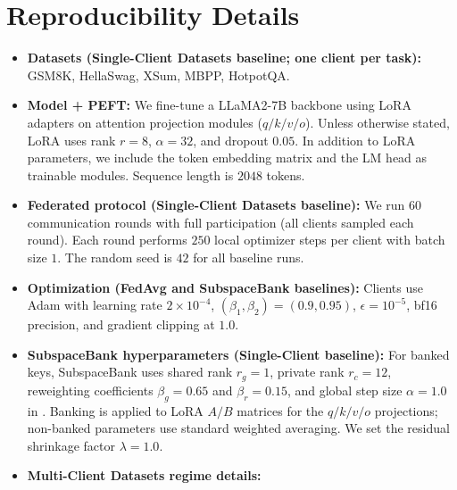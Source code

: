 \documentclass{article}
\theoremstyle{plain}
\theoremstyle{definition}
\theoremstyle{remark}
\begin{document}
\nocite{langley00}




\newpage
\appendix
\onecolumn

\section{Reproducibility Details}
\label{sec:appendix-repro}

\begin{itemize}
  \item \textbf{Datasets (Single-Client Datasets baseline; one client per task):}
  GSM8K, HellaSwag, XSum, MBPP, HotpotQA.

  \item \textbf{Model + PEFT:}
  We fine-tune a LLaMA2-7B backbone using LoRA adapters on attention projection
  modules ($q/k/v/o$). Unless otherwise stated, LoRA uses rank $r=8$,
  $\alpha=32$, and dropout $0.05$. In addition to LoRA parameters, we include
  the token embedding matrix and the LM head as trainable modules. Sequence
  length is $2048$ tokens.

  \item \textbf{Federated protocol (Single-Client Datasets baseline):}
  We run $60$ communication rounds with full participation (all clients sampled
  each round). Each round performs $250$ local optimizer steps per client with
  batch size $1$. The random seed is $42$ for all baseline runs.

  \item \textbf{Optimization (FedAvg and SubspaceBank baselines):}
  Clients use Adam with learning rate $2\times 10^{-4}$,
  $(\beta_1,\beta_2)=(0.9,0.95)$, $\epsilon=10^{-5}$, bf16 precision, and
  gradient clipping at $1.0$.

  \item \textbf{SubspaceBank hyperparameters (Single-Client baseline):}
  For banked keys, SubspaceBank uses shared rank $r_g=1$, private rank $r_c=12$,
  reweighting coefficients $\beta_g=0.65$ and $\beta_r=0.15$, and global step
  size $\alpha=1.0$ in . Banking is applied to LoRA $A/B$
  matrices for the $q/k/v/o$ projections; non-banked parameters use standard
  weighted averaging. We set the residual shrinkage factor $\lambda=1.0$.

  \item \textbf{Multi-Client Datasets regime details:}
\end{itemize}
\end{document}
